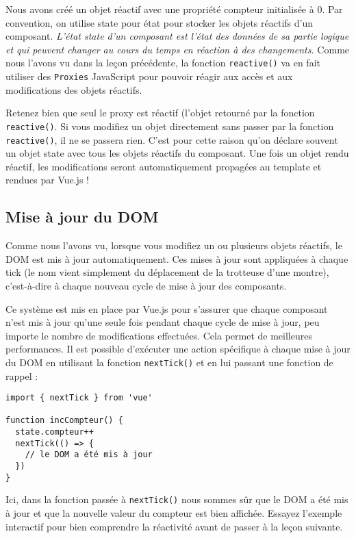 Nous avons créé un objet réactif avec une propriété {\color{monOrange}compteur} initialisée à 0. Par convention, on utilise {\color{monOrange}state} pour état pour stocker les objets réactifs d'un composant.
{\em 
L'état {\color{monOrange}state} d'un composant est l'état des données de sa partie logique et qui peuvent changer au cours du temps en réaction à des changements.
}
Comme nous l'avons vu dans la leçon précédente, la fonction {\tt reactive()} va en fait utiliser des {\tt Proxies} JavaScript pour pouvoir réagir aux accès et aux modifications des objets réactifs.

Retenez bien que seul le proxy est réactif (l'objet retourné par la fonction {\tt reactive()}. Si vous modifiez un objet directement sans passer par la fonction {\tt reactive()}, il ne se passera rien. C'est pour cette raison qu'on déclare souvent un objet {\color{monOrange}state} avec tous les objets réactifs du composant. Une fois un objet rendu réactif, les modifications seront automatiquement propagées au template et rendues par Vue.js !

\subsection{Mise à jour du DOM}
Comme nous l'avons vu, lorsque vous modifiez un ou plusieurs objets réactifs, le DOM est mis à jour automatiquement. Ces mises à jour sont appliquées à chaque {\color{monOrange}tick} (le nom vient simplement du déplacement de la trotteuse d'une montre), c'est-à-dire à chaque nouveau cycle de mise à jour des composants.

Ce système est mis en place par {\color{monOrange}Vue.js} pour s'assurer que chaque composant n'est mis à jour qu'une seule fois pendant chaque cycle de mise à jour, peu importe le nombre de modifications effectuées. Cela permet de meilleures performances. Il est possible d'exécuter une action spécifique à chaque mise à jour du DOM en utilisant la fonction {\tt nextTick()} et en lui passant une fonction de rappel :
\begin{verbatim}
import { nextTick } from 'vue'

function incCompteur() {
  state.compteur++
  nextTick(() => {
    // le DOM a été mis à jour
  })
}
\end{verbatim}
Ici, dans la fonction passée à {\tt nextTick()} nous sommes sûr que le DOM a été mis à jour et que la nouvelle valeur du compteur est bien affichée. Essayez l'exemple interactif pour bien comprendre la réactivité avant de passer à la leçon suivante.

